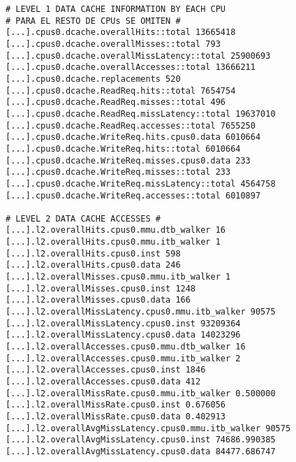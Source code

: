 \begin{lstlisting}[basicstyle=\ttfamily,label=metricasCompletas,showstringspaces=false]
# LEVEL 1 DATA CACHE INFORMATION BY EACH CPU
# PARA EL RESTO DE CPUs SE OMITEN #
[...].cpus0.dcache.overallHits::total 13665418
[...].cpus0.dcache.overallMisses::total 793
[...].cpus0.dcache.overallMissLatency::total 25900693
[...].cpus0.dcache.overallAccesses::total 13666211
[...].cpus0.dcache.replacements 520
[...].cpus0.dcache.ReadReq.hits::total 7654754
[...].cpus0.dcache.ReadReq.misses::total 496
[...].cpus0.dcache.ReadReq.missLatency::total 19637010
[...].cpus0.dcache.ReadReq.accesses::total 7655250
[...].cpus0.dcache.WriteReq.hits.cpus0.data 6010664
[...].cpus0.dcache.WriteReq.hits::total 6010664
[...].cpus0.dcache.WriteReq.misses.cpus0.data 233
[...].cpus0.dcache.WriteReq.misses::total 233
[...].cpus0.dcache.WriteReq.missLatency::total 4564758
[...].cpus0.dcache.WriteReq.accesses::total 6010897

# LEVEL 2 DATA CACHE ACCESSES #
[...].l2.overallHits.cpus0.mmu.dtb_walker 16
[...].l2.overallHits.cpus0.mmu.itb_walker 1
[...].l2.overallHits.cpus0.inst 598
[...].l2.overallHits.cpus0.data 246
[...].l2.overallMisses.cpus0.mmu.itb_walker 1
[...].l2.overallMisses.cpus0.inst 1248
[...].l2.overallMisses.cpus0.data 166
[...].l2.overallMissLatency.cpus0.mmu.itb_walker 90575
[...].l2.overallMissLatency.cpus0.inst 93209364
[...].l2.overallMissLatency.cpus0.data 14023296
[...].l2.overallAccesses.cpus0.mmu.dtb_walker 16
[...].l2.overallAccesses.cpus0.mmu.itb_walker 2
[...].l2.overallAccesses.cpus0.inst 1846
[...].l2.overallAccesses.cpus0.data 412
[...].l2.overallMissRate.cpus0.mmu.itb_walker 0.500000
[...].l2.overallMissRate.cpus0.inst 0.676056
[...].l2.overallMissRate.cpus0.data 0.402913
[...].l2.overallAvgMissLatency.cpus0.mmu.itb_walker 90575
[...].l2.overallAvgMissLatency.cpus0.inst 74686.990385
[...].l2.overallAvgMissLatency.cpus0.data 84477.686747
\end{lstlisting}
